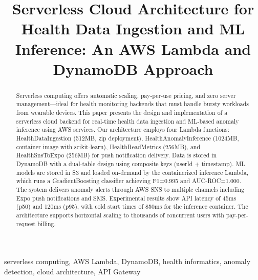 \documentclass[conference]{IEEEtran}
\begin{document}
\title{Serverless Cloud Architecture for Health Data Ingestion and ML Inference: An AWS Lambda and DynamoDB Approach}

\author{
}

\maketitle

\begin{abstract}
Serverless computing offers automatic scaling, pay-per-use pricing, and zero server management---ideal for health monitoring backends that must handle bursty workloads from wearable devices. This paper presents the design and implementation of a serverless cloud backend for real-time health data ingestion and ML-based anomaly inference using AWS services. Our architecture employs four Lambda functions: HealthDataIngestion (512MB, zip deployment), HealthAnomalyInference (1024MB, container image with scikit-learn), HealthReadMetrics (256MB), and HealthSnsToExpo (256MB) for push notification delivery. Data is stored in DynamoDB with a dual-table design using composite keys (userId + timestamp). ML models are stored in S3 and loaded on-demand by the containerized inference Lambda, which runs a GradientBoosting classifier achieving F1=0.995 and AUC-ROC=1.000. The system delivers anomaly alerts through AWS SNS to multiple channels including Expo push notifications and SMS. Experimental results show API latency of 45ms (p50) and 120ms (p95), with cold start times of 850ms for the inference container. The architecture supports horizontal scaling to thousands of concurrent users with pay-per-request billing.
\end{abstract}

\begin{IEEEkeywords}
serverless computing, AWS Lambda, DynamoDB, health informatics, anomaly detection, cloud architecture, API Gateway
\end{IEEEkeywords}
\end{document}
